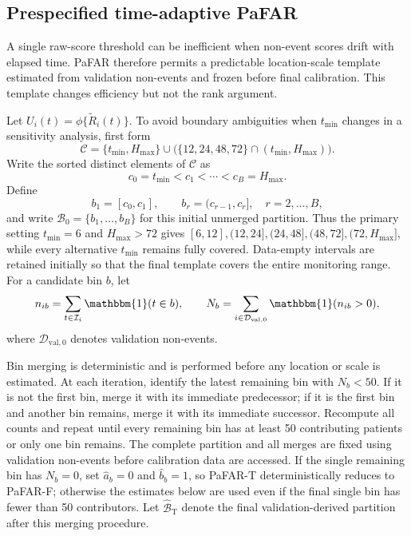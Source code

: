 \documentclass[11pt]{article}
\newcommand{\Ind}{\mathbbm{1}}
\newcommand{\calD}{\mathcal{D}}
\newcommand{\calI}{\mathcal{I}}
\begin{document}
\subsection{Prespecified time-adaptive PaFAR}\label{subsec:adaptive}

A single raw-score threshold can be inefficient when non-event scores drift with elapsed time. PaFAR therefore permits a predictable location-scale template estimated from validation non-events and frozen before final calibration. This template changes efficiency but not the rank argument.

Let $U_i(t)=\phi\{\widetilde R_i(t)\}$. To avoid boundary ambiguities when $t_{\min}$ changes in a sensitivity analysis, first form
\[
\mathcal C=\{t_{\min},H_{\max}\}\cup
\bigl(\{12,24,48,72\}\cap(t_{\min},H_{\max})\bigr).
\]
Write the sorted distinct elements of $\mathcal C$ as
\[
c_0=t_{\min}<c_1<\cdots<c_B=H_{\max}.
\]
Define
\begin{equation}
b_1=[c_0,c_1],\qquad b_r=(c_{r-1},c_r],\quad r=2,\ldots,B,
\label{eq:time-bins}
\end{equation}
and write $\mathcal B_0=\{b_1,\ldots,b_B\}$ for this initial unmerged partition. Thus the primary setting $t_{\min}=6$ and $H_{\max}>72$ gives $[6,12],(12,24],(24,48],(48,72],(72,H_{\max}]$, while every alternative $t_{\min}$ remains fully covered. Data-empty intervals are retained initially so that the final template covers the entire monitoring range. For a candidate bin $b$, let
\[
n_{ib}=\sum_{t\in\calI_i}\Ind(t\in b),
\qquad
N_b=\sum_{i\in\calD_{\mathrm{val},0}}\Ind(n_{ib}>0),
\]
where $\calD_{\mathrm{val},0}$ denotes validation non-events.

Bin merging is deterministic and is performed before any location or scale is estimated. At each iteration, identify the latest remaining bin with $N_b<50$. If it is not the first bin, merge it with its immediate predecessor; if it is the first bin and another bin remains, merge it with its immediate successor. Recompute all counts and repeat until every remaining bin has at least 50 contributing patients or only one bin remains. The complete partition and all merges are fixed using validation non-events before calibration data are accessed. If the single remaining bin has $N_b=0$, set $\widehat a_b=0$ and $\widehat b_b=1$, so PaFAR-T deterministically reduces to PaFAR-F; otherwise the estimates below are used even if the final single bin has fewer than 50 contributors. Let $\widehat{\mathcal B}_{\mathrm{T}}$ denote the final validation-derived partition after this merging procedure.
\end{document}
